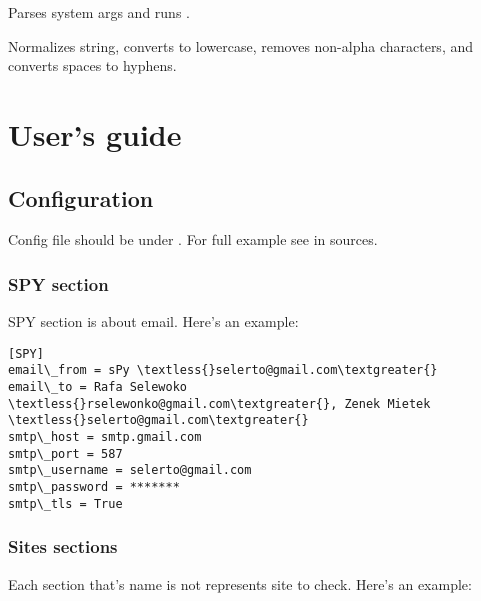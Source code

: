 \documentclass[letterpaper,10pt,english]{sphinxmanual}
\begin{document}

\begin{fulllineitems}
\label{index:spy.main}
Parses system args and runs .

\end{fulllineitems}


\begin{fulllineitems}
\label{index:spy.slugify}
Normalizes string, converts to lowercase, removes non-alpha characters,
and converts spaces to hyphens.

\end{fulllineitems}



\chapter{User's guide}
\label{index:user-s-guide}

\section{Configuration}
\label{index:configuration}
Config file should be under . For full example see  in sources.


\subsection{SPY section}
\label{index:spy-section}
SPY section is about email. Here's an example:

\begin{Verbatim}[commandchars=\\\{\}]
[SPY]
email\_from = sPy \textless{}selerto@gmail.com\textgreater{}
email\_to = Rafa Selewoko \textless{}rselewonko@gmail.com\textgreater{}, Zenek Mietek \textless{}selerto@gmail.com\textgreater{}
smtp\_host = smtp.gmail.com
smtp\_port = 587
smtp\_username = selerto@gmail.com
smtp\_password = *******
smtp\_tls = True
\end{Verbatim}


\subsection{Sites sections}
\label{index:sites-sections}
Each section that's name is not  represents site to check. Here's an example:
\end{document}
